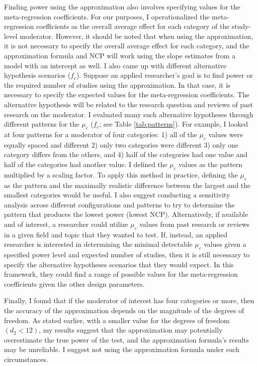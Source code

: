 Finding power using the approximation also involves specifying values for the meta-regression coefficients. For our purposes, I operationalized the meta-regression coefficients as the overall average effect for each category of the study-level moderator. However, it should be noted that when using the approximation, it is not necessary to specify the overall average effect for each category, and the approximation formula and NCP will work using the slope estimates from a model with an intercept as well. I also came up with different alternative hypothesis scenarios ($f_c$). Suppose an applied researcher's goal is to find power or the required number of studies using the approximation. In that case, it is necessary to specify the expected values for the meta-regression coefficients. The alternative hypothesis will be related to the research question and reviews of past research on the moderator. I evaluated many such alternative hypotheses through different patterns for the $\mu_c$ ($f_c$; see Table \ref{tab:patterns}). For example, I looked at four patterns for a moderator of four categories: 1) all of the $\mu_c$ values were equally spaced and different 2) only two categories were different 3) only one category differs from the others, and 4) half of the categories had one value and half of the categories had another value. I defined the $\mu_c$ values as the pattern multiplied by a scaling factor.  To apply this method in practice, defining the $\mu_c$ as the pattern and the maximally realistic difference between the largest and the smallest categories would be useful. I also suggest conducting a sensitivity analysis across different configurations and patterns to try to determine the pattern that produces the lowest power (lowest NCP). Alternatively, if available and of interest, a researcher could utilize $\mu_c$ values from past research or reviews in a given field and topic that they wanted to test. If, instead, an applied researcher is interested in determining the minimal detectable $\mu_c$ values given a specified power level and expected number of studies, then it is still necessary to specify the alternative hypotheses scenarios that they would expect. In this framework, they could find a range of possible values for the meta-regression coefficients given the other design parameters. 


Finally, I found that if the moderator of interest has four categories or more, then the accuracy of the approximation depends on the magnitude of the degrees of freedom. As stated earlier, with a smaller value for the degrees of freedom $(d_2 < 12)$, my results suggest that the approximation may potentially overestimate the true power of the test, and the approximation formula's results may be unreliable. I suggest not using the approximation formula under such circumstances.

